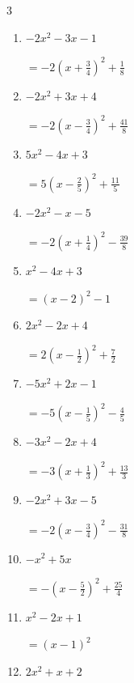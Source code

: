 \begin{multicols}{3}
\begin{enumerate}
\columnbreak %

  \item $-2x^{2}-3x-1$

        $\displaystyle =-2\left( x+\frac{3}{4}\right)^{2}+\frac{1}{8}$

  \item $-2x^{2}+3x+4$

        $\displaystyle =-2\left( x-\frac{3}{4}\right)^{2}+\frac{41}{8}$

  \item $5x^{2}-4x+3$

        $\displaystyle =5\left( x-\frac{2}{5}\right)^{2}+\frac{11}{5}$

  \item $-2x^{2}-x-5$

        $\displaystyle =-2\left( x+\frac{1}{4}\right)^{2}-\frac{39}{8}$

  \item $x^{2}-4x+3$

        $\displaystyle =\left( x-2\right)^{2}-1$

\columnbreak %

\resetques

  \item $2x^{2}-2x+4$

        $\displaystyle =2\left( x-\frac{1}{2}\right)^{2}+\frac{7}{2}$

  \item $-5x^{2}+2x-1$

        $\displaystyle =-5\left( x-\frac{1}{5}\right)^{2}-\frac{4}{5}$

  \item $-3x^{2}-2x+4$

        $\displaystyle =-3\left( x+\frac{1}{3}\right)^{2}+\frac{13}{3}$

  \item $-2x^{2}+3x-5$

        $\displaystyle =-2\left( x-\frac{3}{4}\right)^{2}-\frac{31}{8}$

  \item $-x^{2}+5x$

        $\displaystyle =-\left( x-\frac{5}{2}\right)^{2}+\frac{25}{4}$

\columnbreak %

  \item $x^{2}-2x+1$

        $\displaystyle =\left( x-1\right)^{2}$

  \item $2x^{2}+x+2$


\end{enumerate}
\end{multicols}
